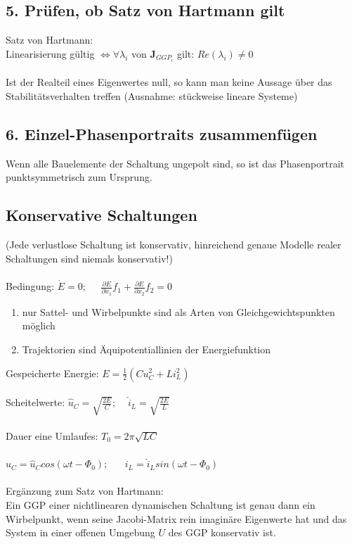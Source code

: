 \documentclass[a4paper,twocolumn,10pt]{article}
\begin{document}
\subsection*{5. Prüfen, ob Satz von Hartmann gilt}
Satz von Hartmann:\\
Linearisierung gültig $\Leftrightarrow \forall \lambda_i$ von $\textbf{J}_{GGP_i}$ gilt: $Re(\lambda_i)\neq 0$\\\\
Ist der Realteil eines Eigenwertes null, so kann man keine Aussage über das Stabilitätsverhalten treffen (Ausnahme: stückweise lineare Systeme)
\subsection*{6. Einzel-Phasenportraits zusammenfügen}
Wenn alle Bauelemente der Schaltung ungepolt sind, so ist das Phasenportrait punktsymmetrisch zum Ursprung.

\subsection*{Konservative Schaltungen}
(Jede verlustlose Schaltung ist konservativ, hinreichend genaue Modelle realer Schaltungen sind niemals konservativ!)\\\\
Bedingung: $\dot E=0;\;\;\;\;\;\frac{\partial E}{\partial x_1}f_1+\frac{\partial E}{\partial x_2}f_2=0$
\begin{enumerate}[label=-,leftmargin=3mm]
	\item nur Sattel- und Wirbelpunkte sind als Arten von Gleichgewichtspunkten möglich
	\item Trajektorien sind Äquipotentiallinien der Energiefunktion
\end{enumerate}
Gespeicherte Energie: $E=\frac{1}{2}(Cu_C^2+Li_L^2)$\\\\
Scheitelwerte: $\hat{u}_C=\sqrt{\frac{2E}{C}};\;\;\;\;\hat{i}_L=\sqrt{\frac{2E}{L}}$\\\\
Dauer eine Umlaufes: $T_0=2\pi \sqrt{LC}$\\\\
$u_C=\hat{u}_C cos(\omega t-\Phi_0);\;\;\;\;\;\;i_L=\hat{i}_L sin(\omega t-\Phi_0)$\\\\
Ergänzung zum Satz von Hartmann:\\
Ein GGP einer nichtlinearen dynamischen Schaltung ist genau dann ein Wirbelpunkt, wenn seine Jacobi-Matrix rein imaginäre Eigenwerte hat und das System in einer offenen Umgebung $U$ des GGP konservativ ist.
\end{document}
